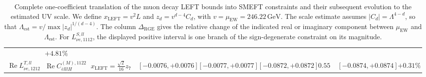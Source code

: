 \begin{table}[htbp]
{\begin{tabular}{lllllllll}
        & \(+4.81\%\)
        \\
        \(\operatorname{Re}L_{\nu e,1212}^{T,ll}\)
        & \(\operatorname{Re}C_{\bar e lllH}^{(M),1122}\)
        & \(x_{\mathrm{LEFT}}=\frac{\sqrt2}{16}z_7\)
        & \([-0.0076,+0.0076]\)
        & \([-0.0077,+0.0077]\)
        & \([-0.0872,+0.0872]\)
        & \(0.555\)
        & \([-0.0874,+0.0874]\)
        & \(+0.31\%\)
        \\
        \bottomrule
    \end{tabular}%
    }
    \caption{%
        Complete one-coefficient translation of the muon decay LEFT bounds
        into SMEFT constraints and their subsequent evolution to the estimated
        UV scale. We define \(x_{\mathrm{LEFT}}=v^2L\) and
        \(z_d=v^{d-4}C_d\), with
        \(v=\mu_{\mathrm{EW}}=246.22\,\mathrm{GeV}\). The scale estimate assumes
        \(\lvert C_d\rvert=\Lambda^{4-d}\), so that
        \(\Lambda_{\mathrm{est}}
        =v/\max\lvert z_d\rvert^{1/(d-4)}\).
        The column \(\Delta_{\mathrm{RGE}}\) gives the relative change of the
        indicated real or imaginary component between
        \(\mu_{\mathrm{EW}}\) and \(\Lambda_{\mathrm{est}}\).
        For \(L_{\nu e,1112}^{S,ll}\), the displayed positive interval is
        one branch of the sign-degenerate constraint on its magnitude.
    }
    \label{tab:smeft-rge-primary}
\end{table}



